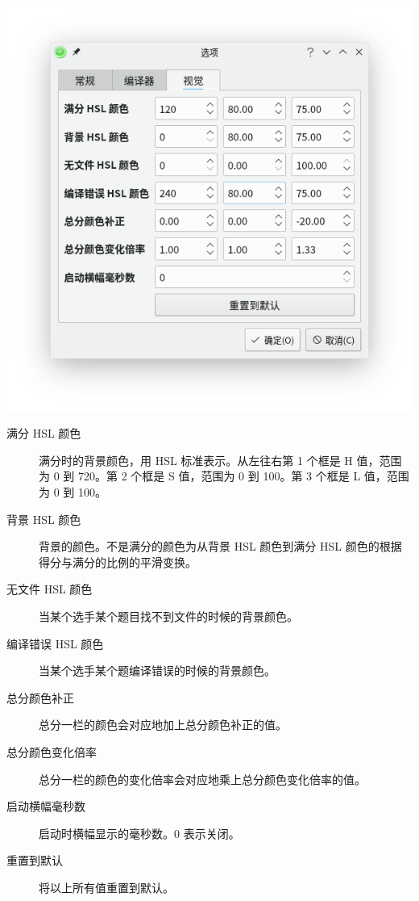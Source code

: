 \documentclass[UTF-8]{ctexart}
\begin{document}
				\begin{center}
				\includegraphics[scale=0.7]{pics/visualsettings.png}
				\end{center}
			
				\begin{description}
					\item[满分 HSL 颜色] 满分时的背景颜色，用 HSL 标准表示。从左往右第 1 个框是 H 值，范围为 0 到 720。第 2 个框是 S 值，范围为 0 到 100。第 3 个框是 L 值，范围为 0 到 100。
					\item[背景 HSL 颜色] 背景的颜色。不是满分的颜色为从背景 HSL 颜色到满分 HSL 颜色的根据得分与满分的比例的平滑变换。
					\item[无文件 HSL 颜色] 当某个选手某个题目找不到文件的时候的背景颜色。
					\item[编译错误 HSL 颜色] 当某个选手某个题编译错误的时候的背景颜色。
					\item[总分颜色补正] 总分一栏的颜色会对应地加上总分颜色补正的值。
					\item[总分颜色变化倍率] 总分一栏的颜色的变化倍率会对应地乘上总分颜色变化倍率的值。
					\item[启动横幅毫秒数] 启动时横幅显示的毫秒数。0 表示关闭。
					\item[重置到默认] 将以上所有值重置到默认。
				\end{description}
			
\end{document}
